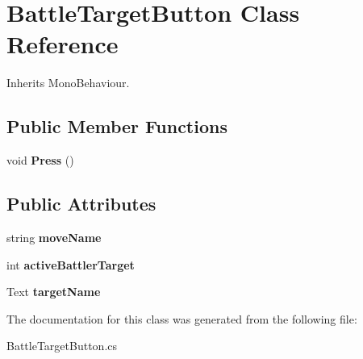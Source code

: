 \hypertarget{class_battle_target_button}{}\section{Battle\+Target\+Button Class Reference}
\label{class_battle_target_button}


Inherits Mono\+Behaviour.

\subsection*{Public Member Functions}
\begin{DoxyCompactItemize}
\item 
\mbox{\label{class_battle_target_button_aa507c19ea6f38fee331d74b5c07d8587}} 
void {\bfseries Press} ()
\end{DoxyCompactItemize}
\subsection*{Public Attributes}
\begin{DoxyCompactItemize}
\item 
\mbox{\label{class_battle_target_button_ac3029978c91c74909072df6a0c6d5caf}} 
string {\bfseries move\+Name}
\item 
\mbox{\label{class_battle_target_button_a40cbafc2a3075754fafaf4eb51982e65}} 
int {\bfseries active\+Battler\+Target}
\item 
\mbox{\label{class_battle_target_button_aa62292030f35fa86dc6e5c6288260aea}} 
Text {\bfseries target\+Name}
\end{DoxyCompactItemize}


The documentation for this class was generated from the following file\+:\begin{DoxyCompactItemize}
\item 
Battle\+Target\+Button.\+cs\end{DoxyCompactItemize}
